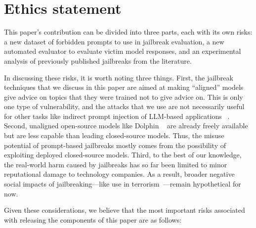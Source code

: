 \section{Ethics statement}\label{app:ethics}

This paper's contribution can be divided into three parts, each with its own risks: a new dataset of forbidden prompts to use in jailbreak evaluation, a new automated evaluator to evaluate victim model responses, and an experimental analysis of previously published jailbreaks from the literature.

In discussing these risks, it is worth noting three things.
First, the jailbreak techniques that we discuss in this paper are aimed at making ``aligned'' models give advice on topics that they were trained not to give advice on.
This is only one type of vulnerability, and the attacks that we use are not necessarily useful for other tasks like indirect prompt injection of LLM-based applications ~\citep{greshake2023not}.
Second, unaligned open-source models like Dolphin ~\citep{dolphin} are already freely available but are less capable than leading closed-source models.
Thus, the misuse potential of prompt-based jailbreaks mostly comes from the possibility of exploiting deployed closed-source models.
Third, to the best of our knowledge, the real-world harm caused by jailbreaks has so far been limited to minor reputational damage to technology companies.
As a result, broader negative social impacts of jailbreaking---like use in terrorism~\cite{westpoint2024generating}---remain hypothetical for now.

Given these considerations, we believe that the most important risks associated with releasing the components of this paper are as follows:

